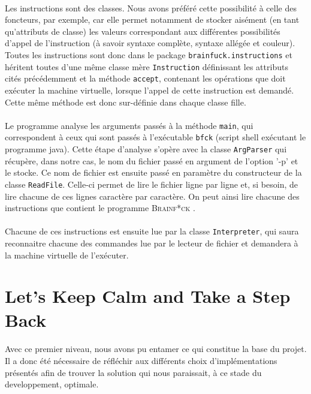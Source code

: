 \documentclass[a4paper]{article}
\begin{document}
\paragraph{}Les instructions sont des classes. Nous avons préféré cette possibilité à celle des foncteurs, par exemple, car elle permet notamment de stocker aisément (en tant qu'attributs de classe) les valeurs correspondant aux différentes possibilités d'appel de l'instruction (à savoir syntaxe complète, syntaxe allégée et couleur).
Toutes les instructions sont donc dans le package \texttt{brainfuck.instructions} et héritent toutes d'une même classe mère \texttt{Instruction} définissant les attributs cités précédemment et la méthode \texttt{accept}, contenant les opérations que doit exécuter la machine virtuelle, lorsque l'appel de cette instruction est demandé. Cette même méthode est donc sur-définie dans chaque classe fille.
\paragraph{}Le programme analyse les arguments passés à la méthode \texttt{main}, qui correspondent à ceux qui sont passés à l'exécutable \texttt{bfck} (script shell exécutant le programme java). Cette étape d'analyse s'opère avec la classe \texttt{ArgParser} qui récupère, dans notre cas, le nom du fichier passé en argument de l'option '-p' et le stocke.
Ce nom de fichier est ensuite passé en paramètre du constructeur de la classe \texttt{ReadFile}. Celle-ci permet de lire le fichier ligne par ligne et, si besoin, de lire chacune de ces lignes caractère par caractère. On peut ainsi lire chacune des instructions que contient le programme \textsc{Brainf*ck} .
\paragraph{}Chacune de ces instructions est ensuite lue par la classe \texttt{Interpreter}, qui saura reconnaitre chacune des commandes lue par le lecteur de fichier et demandera à la machine virtuelle de l'exécuter.

\section{Let's Keep Calm and Take a Step Back}
\paragraph{}Avec ce premier niveau, nous avons pu entamer ce qui constitue la base du projet. Il a donc été nécessaire de réfléchir aux différents choix d'implémentations présentés afin de trouver la solution qui nous paraissait, à ce stade du developpement, optimale. 
\end{document}
